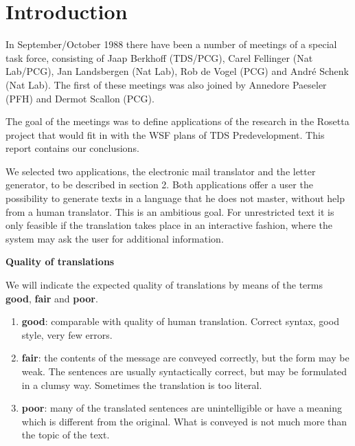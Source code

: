 



   \RosDate{\today}
   \RosSupersedes{-}
   \RosKeywords{}
   \MakeRosTitle
%
%

\section{Introduction}

In September/October 1988 there have been a number of meetings of a special 
task force, consisting of 
Jaap Berkhoff (TDS/PCG), Carel 
Fellinger (Nat Lab/PCG), Jan Landsbergen (Nat Lab), Rob de Vogel
(PCG) and Andr\'{e} Schenk (Nat Lab). The first of these 
meetings was also joined by Annedore Paeseler (PFH) and Dermot Scallon (PCG). 

The goal of the meetings 
was to define applications of the research in the Rosetta project that 
would fit in with the WSF plans of TDS Predevelopment. This report contains our
conclusions.
 
\bigskip

We selected two applications, the 
electronic
mail translator and the letter generator, to be described in section 2. 
Both applications offer a user the possibility to generate
texts in a language that he does not master, without help from a human 
translator.
This is an ambitious goal. For unrestricted text it
is only feasible if the translation takes place 
in an interactive fashion, where the system may ask the user for additional 
information.


\bigskip

{\bf Quality of translations}

We will indicate the expected quality of translations by means of the terms 
{\bf good}, {\bf fair} and {\bf poor}.

\begin{enumerate}

\item {\bf good}: 
comparable with quality of human translation. Correct syntax, good 
style, very few errors.

\item {\bf fair}: the contents of  the message are conveyed correctly, 
but the form may 
be weak. The sentences are usually syntactically 
correct, but may be 
formulated in a clumsy way. Sometimes the translation is too literal.


\item {\bf poor}: many of the translated sentences are unintelligible or have 
a meaning which is different from the original. What is conveyed is not much 
more than the topic of the text.



\end{enumerate}

